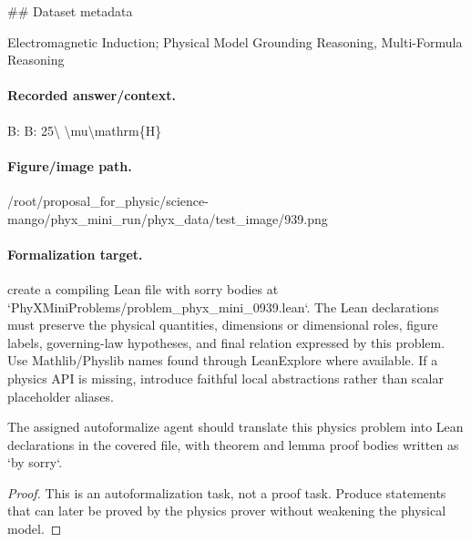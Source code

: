 \#\# Dataset metadata

Electromagnetic Induction; Physical Model Grounding Reasoning, Multi-Formula Reasoning

\paragraph{Recorded answer/context.}
B: B: 25\textbackslash{} \textbackslash{}mu\textbackslash{}mathrm\{H\}

\paragraph{Figure/image path.}
/root/proposal\_for\_physic/science-mango/phyx\_mini\_run/phyx\_data/test\_image/939.png

\paragraph{Formalization target.}
create a compiling Lean file with sorry bodies at `PhyXMiniProblems/problem\_phyx\_mini\_0939.lean`. The Lean declarations must preserve the physical quantities, dimensions or dimensional roles, figure labels, governing-law hypotheses, and final relation expressed by this problem.
Use Mathlib/Physlib names found through LeanExplore where available. If a physics API is missing, introduce faithful local abstractions rather than scalar placeholder aliases.

\begin{theorem}
\label{thm:physics:phyx_mini_0939:target}
The assigned autoformalize agent should translate this physics problem into Lean declarations in the covered file, with theorem and lemma proof bodies written as `by sorry`.
\end{theorem}
\begin{proof}
This is an autoformalization task, not a proof task. Produce statements that can later be proved by the physics prover without weakening the physical model.
\end{proof}

